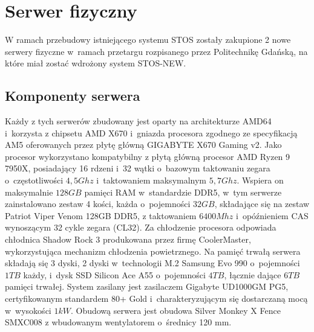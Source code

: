 \section{Serwer fizyczny}
W ramach przebudowy istniejącego systemu STOS zostały zakupione 2 nowe serwery fizyczne w~ramach przetargu rozpisanego przez Politechnikę Gdańską, na które miał zostać wdrożony system STOS-NEW.

\subsection{Komponenty serwera}
Każdy z tych serwerów zbudowany jest oparty na architekturze AMD64 i~korzysta z chipsetu AMD X670 i~gniazda procesora zgodnego ze specyfikacją AM5 oferowanych przez płytę główną GIGABYTE X670 Gaming v2\cite{gigabyteX670}. Jako procesor wykorzystano kompatybilny z płytą główną procesor AMD Ryzen 9 7950X, posiadający 16 rdzeni i~32 wątki o~bazowym taktowaniu zegara o~częstotliwości $4,5 Ghz$ i~taktowaniem maksymalnym $5,7 Ghz$\cite{ryzen}. Wspiera on maksymalnie $128 GB$ pamięci RAM w~standardzie DDR5, w~tym serwerze zainstalowano zestaw 4 kości, każda o~pojemności $32 GB$, składające się na zestaw Patriot Viper Venom 128GB DDR5, z taktowaniem $6400 Mhz$ i~opóźnieniem CAS wynoszącym 32 cykle zegara (CL32)\cite{patriotRam}. Za chłodzenie procesora odpowiada chłodnica Shadow Rock 3 produkowana przez firmę CoolerMaster, wykorzystująca mechanizm chłodzenia powietrznego\cite{coolermaster}. Na pamięć trwałą serwera składają się 3 dyski, 2 dyski w~technologii M.2 Samsung Evo 990 o~pojemności $1 TB$ każdy\cite{samsungSsd}, i~dysk SSD Silicon Ace A55\cite{sataSsd} o~pojemności $4 TB$, łącznie dające $6 TB$ pamięci trwałej. System zasilany jest zasilaczem Gigabyte UD1000GM PG5, certyfikowanym standardem 80+ Gold i~charakteryzującym się dostarczaną mocą w~wysokości $1 kW$\cite{zasilka}.  Obudową serwera jest obudowa Silver Monkey X Fence SMXC008 z wbudowanym wentylatorem o~średnicy 120 mm\cite{obudowa}.

